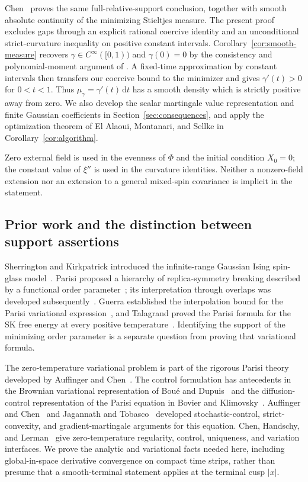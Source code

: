\documentclass[11pt]{article}
\newcommand{\dd}{\mathrm d}
\theoremstyle{remark}
\numberwithin{equation}{section}
\begin{document}
Chen~\cite[Theorem~1.3]{Chen2026} proves the same full-relative-support
conclusion, together with smooth absolute continuity of the minimizing
Stieltjes measure. The present proof excludes gaps through an explicit
rational coercive identity and an unconditional strict-curvature inequality
on positive constant intervals. Corollary~\ref{cor:smooth-measure}
recovers $\gamma\in C^\infty([0,1))$ and $\gamma(0)=0$ by the
consistency and polynomial-moment argument of
\cite[Proposition~4.6 and Appendix~B.6]{Chen2026}. A fixed-time
approximation by constant intervals then transfers our coercive bound
to the minimizer and gives $\gamma'(t)>0$ for $0<t<1$.
Thus $\mu_\gamma=\gamma'(t)\,\dd t$ has a smooth density which is
strictly positive away from zero. We also develop the scalar martingale
value representation and finite Gaussian coefficients in
Section~\ref{sec:consequences}, and apply the optimization theorem of
El Alaoui, Montanari, and Sellke in Corollary~\ref{cor:algorithm}.

Zero external field is used in the evenness of $\Phi$ and the
initial condition $X_0=0$; the constant value of $\xi''$ is used in the
curvature identities. Neither a nonzero-field extension nor an extension
to a general mixed-spin covariance is implicit in the statement.

\subsection{Prior work and the distinction between support assertions}
Sherrington and Kirkpatrick introduced the infinite-range Gaussian Ising
spin-glass model~\cite{SK1975}. Parisi proposed a hierarchy of
replica-symmetry breaking described by a functional order
parameter~\cite{Parisi1979}; its interpretation through overlaps was
developed subsequently~\cite{Parisi1983}. Guerra established the
interpolation bound for the Parisi variational expression~\cite{Guerra2003},
and Talagrand proved the Parisi formula for the SK free energy at every
positive temperature~\cite{Talagrand2006}. Identifying the support of
the minimizing order parameter is a separate question from proving
that variational formula.

The zero-temperature variational problem is part of the rigorous Parisi
theory developed by Auffinger and Chen~\cite{AC2017}. The control
formulation has antecedents in the Brownian variational representation
of Bou\'e and Dupuis~\cite{BD1998} and the diffusion-control representation
of the Parisi equation in Bovier and Klimovsky~\cite[Section~6.2]{BK2009}.
Auffinger and Chen~\cite{AC2015} and Jagannath and Tobasco~\cite{JT2016}
developed stochastic-control, strict-convexity, and gradient-martingale
arguments for this equation. Chen, Handschy, and
Lerman~\cite[Propositions~2--4, Theorems~4--5, and Lemma~3]{CHL2018}
give zero-temperature regularity, control, uniqueness, and variation
interfaces. We prove the analytic and variational facts needed here,
including global-in-space derivative convergence on compact time strips,
rather than presume that a smooth-terminal statement applies at the
terminal cusp $|x|$.
\end{document}
